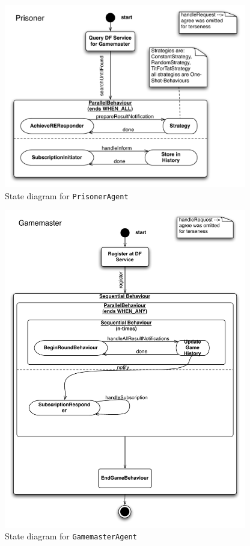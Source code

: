 \documentclass[a4paper,12pt]{article}
\begin{document}
\begin{figure}[h]
	\centering
	\includegraphics[width=400px]{chart1_Part2.pdf}
	\caption{State diagram for \texttt{PrisonerAgent}}
	\label{fig:state_prisoner}
\end{figure}

\begin{figure}[h]
	\centering
	\includegraphics[width=400px]{chart1_Part3.pdf}
	\caption{State diagram for \texttt{GamemasterAgent}}
	\label{fig:state_gm}
\end{figure}
\end{document}
